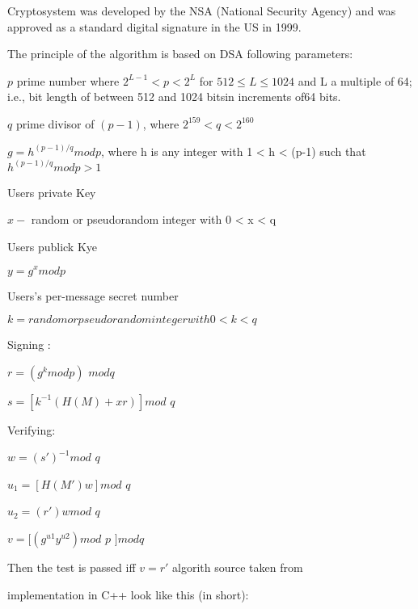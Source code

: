 \documentclass[12pt]{report}
\begin{document}
Cryptosystem was developed by the NSA (National Security Agency) and was approved as a standard digital signature in the US in 1999.

The principle of the algorithm is based on DSA
following parameters:

$p$ prime number where $2^{L-1} < p < 2^{L} $
for $512 \leq L \leq 1024 $ and  L a multiple of 64; i.e., bit length of between 512 and 1024 bitsin increments of64 bits.

$q$ prime divisor of $(p-1)$, where $2^{159} < q < 2^{160} $

$g = h^{(p-1)/q} mod p$, where h is any integer with 1 < h < (p-1) such that $h^{(p-1)/q} mod p > 1$

Users private Key

$ x - $ random or pseudorandom integer with 0 < x < q

Users publick Kye

$ y = g^{x} mod p $

Users's per-message secret number

$k = random or pseudorandom integer with 0 < k < q $

Signing :

$r = (g^{k} mod p) $ $ mod q $

$s = [k^{-1} (H(M) + xr) ] mod $ $q$

Verifying:

$w = (s')^{-1} mod $ $q$

$u_1 = [H(M')w] mod$ $q$

$u_2 = (r')w mod$ $q$

$v = [(g^{u1} y^{u2}) mod$ $p$ $] mod q$

Then the test is passed iff $v = r'$
algorith source taken from \cite{book}


implementation in C++ look like this (in short):
\end{document}
